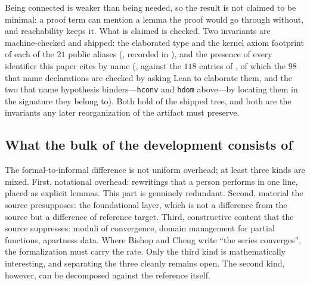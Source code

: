 \documentclass[11pt]{article}
\theoremstyle{definition}
\theoremstyle{remark}
\begin{document}
Being connected is weaker than being needed, so the result is not claimed to be minimal: a proof term can mention a lemma the proof would go through without, and reachability keeps it.  What is claimed is checked.  Two invariants are machine-checked and shipped: the elaborated type and the kernel axiom footprint of each of the $21$ public aliases (, recorded in ), and the presence of every identifier this paper cites by name (, against the $118$ entries of , of which the $98$ that name declarations are checked by asking Lean to elaborate them, and the two that name hypothesis binders---\texttt{hconv} and \texttt{hdom} above---by locating them in the signature they belong to).  Both hold of the shipped tree, and both are the invariants any later reorganization of the artifact must preserve.


\subsection{What the bulk of the development consists of}
\label{sec:cost-layerA}
The formal-to-informal difference is not uniform overhead; at least three kinds are mixed.  First, notational overhead: rewritings that a person performs in one line, placed as explicit lemmas.  This part is genuinely redundant.  Second, material the source presupposes: the foundational layer, which is not a difference from the source but a difference of reference target.  Third, constructive content that the source suppresses: moduli of convergence, domain management for partial functions, apartness data.  Where Bishop and Cheng write ``the series converges'', the formalization must carry the rate.  Only the third kind is mathematically interesting, and separating the three cleanly remains open.  The second kind, however, can be decomposed against the reference itself.
\end{document}

